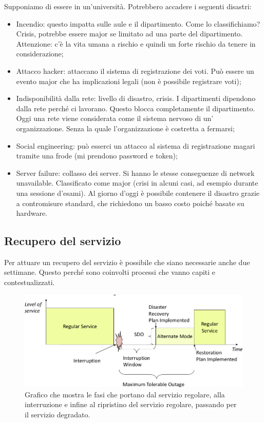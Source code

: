 Supponiamo di essere in un'università.
Potrebbero accadere i seguenti disastri:
\begin{itemize}
 \item Incendio: questo impatta sulle aule e il dipartimento. Come lo
classifichiamo? Crisis, potrebbe essere major se limitato ad una parte del
dipartimento. Attenzione: c'è la vita umana a rischio e quindi un forte
rischio da tenere in considerazione;

 \item Attacco hacker: attaccano il sistema di registrazione dei voti. Può essere un
evento major che ha implicazioni legali (non è possibile registrare voti);

 \item Indisponibilità dalla rete: livello di disastro, crisis. I dipartimenti 
dipendono dalla rete perché ci lavorano. Questo blocca completamente il 
dipartimento. Oggi una rete viene considerata come il sistema nervoso di un' 
organizzazione. Senza la quale l'organizzazione è costretta a fermarsi;

 \item Social engineering: può esserci un attacco al sistema di registrazione magari tramite una frode
(mi prendono password e token);

 \item Server failure: collasso dei server. Si hanno le stesse conseguenze di network unavailable.
Classificato come major (crisi in alcuni casi, ad esempio durante una sessione
d'esami). Al giorno d'oggi è possibile contenere il disastro grazie a
contromisure
standard, che richiedono un basso costo poiché basate su hardware.
\end{itemize}

\subsection{Recupero del servizio}

Per attuare un recupero del servizio è possibile che siano necessarie anche due
settimane.
Questo perché sono coinvolti processi che vanno capiti e contestualizzati.

\begin{figure}[h!]
        \begin{center}
                \includegraphics[scale=0.65]{res/img/recovery-times.png}
        \end{center}
        \caption{Grafico che mostra le fasi che portano dal servizio 
        regolare, alla interruzione e infine al ripristino del servizio 
        regolare, passando per il servizio degradato.}
\end{figure}

